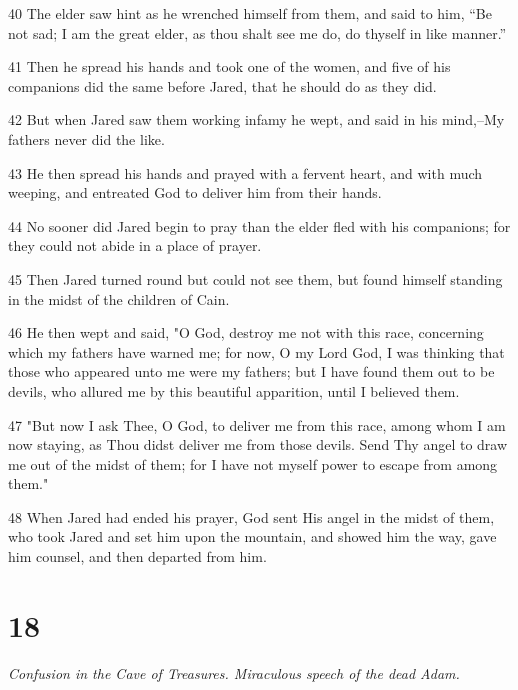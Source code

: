 \par 40 The elder saw hint as he wrenched himself from them, and said to him, “Be not sad; I am the great elder, as thou shalt see me do, do thyself in like manner.”

\par 41 Then he spread his hands and took one of the women, and five of his companions did the same before Jared, that he should do as they did.

\par 42 But when Jared saw them working infamy he wept, and said in his mind,--My fathers never did the like.

\par 43 He then spread his hands and prayed with a fervent heart, and with much weeping, and entreated God to deliver him from their hands.

\par 44 No sooner did Jared begin to pray than the elder fled with his companions; for they could not abide in a place of prayer.

\par 45 Then Jared turned round but could not see them, but found himself standing in the midst of the children of Cain.

\par 46 He then wept and said, "O God, destroy me not with this race, concerning which my fathers have warned me; for now, O my Lord God, I was thinking that those who appeared unto me were my fathers; but I have found them out to be devils, who allured me by this beautiful apparition, until I believed them.

\par 47 "But now I ask Thee, O God, to deliver me from this race, among whom I am now staying, as Thou didst deliver me from those devils. Send Thy angel to draw me out of the midst of them; for I have not myself power to escape from among them."

\par 48 When Jared had ended his prayer, God sent His angel in the midst of them, who took Jared and set him upon the mountain, and showed him the way, gave him counsel, and then departed from him.

\chapter{18}

\par \textit{Confusion in the Cave of Treasures. Miraculous speech of the dead Adam.}

